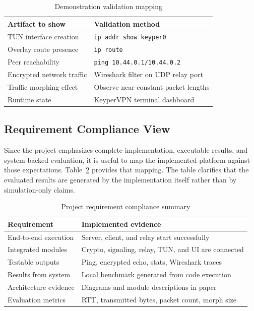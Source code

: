 \documentclass[conference]{IEEEtran}
\begin{document}
\begin{table}[t]
\caption{Demonstration validation mapping}
\label{tab:demo}
\centering
\begin{tabular}{p{2.7cm}p{4.3cm}}
\toprule
Artifact to show & Validation method \\
\midrule
TUN interface creation & \texttt{ip addr show keyper0} \\
Overlay route presence & \texttt{ip route} \\
Peer reachability & \texttt{ping 10.44.0.1/10.44.0.2} \\
Encrypted network traffic & Wireshark filter on UDP relay port \\
Traffic morphing effect & Observe near-constant packet lengths \\
Runtime state & KeyperVPN terminal dashboard \\
\bottomrule
\end{tabular}
\end{table}

\subsection{Requirement Compliance View}
Since the project emphasizes complete implementation, executable results, and system-backed evaluation, it is useful to map the implemented platform against those expectations. Table~\ref{tab:checklist} provides that mapping. The table clarifies that the evaluated results are generated by the implementation itself rather than by simulation-only claims.

\begin{table}[t]
\caption{Project requirement compliance summary}
\label{tab:checklist}
\centering
\begin{tabular}{p{2.6cm}p{4.4cm}}
\toprule
Requirement & Implemented evidence \\
\midrule
End-to-end execution & Server, client, and relay start successfully \\
Integrated modules & Crypto, signaling, relay, TUN, and UI are connected \\
Testable outputs & Ping, encrypted echo, stats, Wireshark traces \\
Results from system & Local benchmark generated from code execution \\
Architecture evidence & Diagrams and module descriptions in paper \\
Evaluation metrics & RTT, transmitted bytes, packet count, morph size \\
\bottomrule
\end{tabular}
\end{table}
\end{document}
